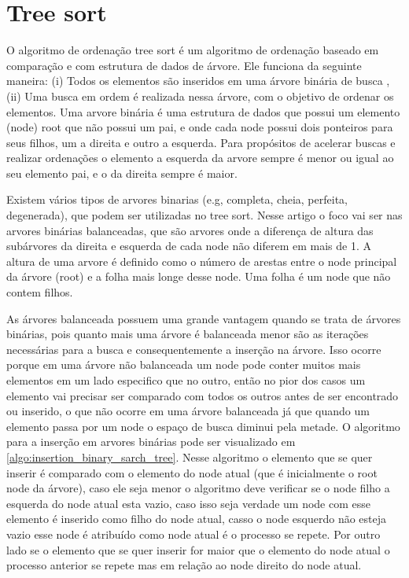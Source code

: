 \documentclass[12pt]{article}
\begin{document}
\section{Tree sort}
\label{sec:sort_algo}
O algoritmo de ordenação tree sort é um algoritmo de ordenação baseado em comparação e com estrutura de dados de árvore. Ele funciona da seguinte maneira: (i) Todos os elementos são inseridos em uma árvore binária de busca \cite{knuth1971optimum}, (ii) Uma busca em ordem é realizada nessa árvore, com o objetivo de ordenar os elementos. Uma arvore binária é uma estrutura de dados que possui um elemento (node) root que não possui um pai, e onde cada node possui dois ponteiros para seus filhos, um a direita e outro a esquerda. Para propósitos de acelerar buscas e realizar ordenações o elemento a esquerda da arvore sempre é menor ou igual ao seu elemento pai, e o da direita sempre é maior. 

Existem vários tipos de arvores binarias (e.g, completa, cheia, perfeita, degenerada), que podem ser utilizadas no tree sort. Nesse artigo o foco vai ser nas arvores binárias balanceadas, que são arvores onde a diferença de altura das subárvores da direita e esquerda de cada node não diferem em mais de 1. A altura de uma arvore é definido como o número de arestas entre o node principal da árvore (root) e a folha mais longe desse node. Uma folha é um node que não contem filhos.

As árvores balanceada possuem uma grande vantagem quando se trata de árvores binárias, pois quanto mais uma árvore é balanceada menor são as iterações necessárias para a busca e consequentemente a inserção na árvore. Isso ocorre porque em uma árvore não balanceada um node pode conter muitos mais elementos em um lado especifico que no outro, então no pior dos casos um elemento vai precisar ser comparado com todos os outros antes de ser encontrado ou inserido, o que não ocorre em uma árvore balanceada já que quando um elemento passa por um node o espaço de busca diminui pela metade. O algoritmo para a inserção em arvores binárias pode ser visualizado em \ref{algo:insertion_binary_sarch_tree}. Nesse algoritmo o elemento que se quer inserir é comparado com o elemento do node atual (que é inicialmente o root node da árvore), caso ele seja menor o algoritmo deve verificar se o node filho a esquerda do node atual esta vazio, caso isso seja verdade um node com esse elemento é inserido como filho do node atual, casso o node esquerdo não esteja vazio esse node é atribuído como node atual é o processo se repete. Por outro lado se o elemento que se quer inserir for maior que o elemento do node atual o processo anterior se repete mas em relação ao node direito do node atual.
\end{document}
